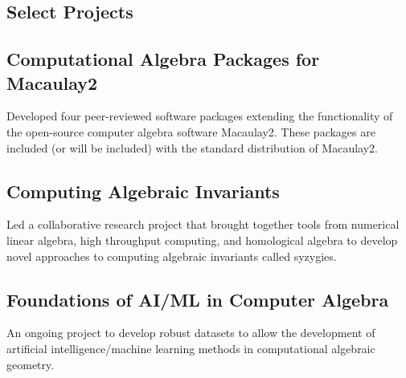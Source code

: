\documentclass[
	10pt, %
]{FreemanCV}
\begin{document}
\begin{paracol}{2}
\section{Select Projects}

\subsection{Computational Algebra Packages for Macaulay2}

Developed four peer-reviewed software packages extending the functionality of the open-source computer algebra software Macaulay2. These packages are  included (or will be included) with the standard distribution of Macaulay2. 

\subsection{Computing Algebraic Invariants }

Led a collaborative research project that brought together tools from numerical linear algebra, high throughput computing, and homological algebra to develop novel approaches to computing algebraic invariants called syzygies. %

\subsection{Foundations of AI/ML in Computer Algebra}

An ongoing project to develop robust datasets to allow the development of artificial intelligence/machine learning methods in computational algebraic geometry.  


%



\end{paracol}
\end{document}
